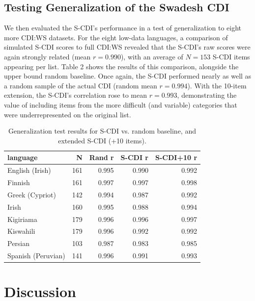 \documentclass[10pt, letterpaper]{article}
\begin{document}
\hypertarget{testing-generalization-of-the-swadesh-cdi}{%
\subsection{Testing Generalization of the Swadesh
CDI}\label{testing-generalization-of-the-swadesh-cdi}}

We then evaluated the S-CDI's performance in a test of generalization to
eight more CDI:WS datasets. For the eight low-data languages, a
comparison of simulated S-CDI scores to full CDI:WS revealed that the
S-CDI's raw scores were again strongly related (mean \(r=0.990\)), with
an average of \(N=153\) S-CDI items appearing per list. Table 2 shows
the results of this comparison, alongside the upper bound random
baseline. Once again, the S-CDI performed nearly as well as a random
sample of the actual CDI (random mean \(r=0.994\)). With the 10-item
extension, the S-CDI's correlation rose to mean \(r=0.993\),
demonstrating the value of including items from the more difficult (and
variable) categories that were underrepresented on the original list.

\begin{table}[H]
\centering
\begingroup\fontsize{9pt}{10pt}\selectfont
\begin{tabular}{lrrrr}
  \hline
language & N & Rand r & S-CDI r & S-CDI+10 r \\ 
  \hline
English (Irish) &  161 & 0.995 & 0.990 & 0.992 \\ 
  Finnish &  161 & 0.997 & 0.997 & 0.998 \\ 
  Greek (Cypriot) &  142 & 0.994 & 0.987 & 0.992 \\ 
  Irish &  160 & 0.995 & 0.988 & 0.994 \\ 
  Kigiriama &  179 & 0.996 & 0.996 & 0.997 \\ 
  Kiswahili &  179 & 0.996 & 0.992 & 0.992 \\ 
  Persian &  103 & 0.987 & 0.983 & 0.985 \\ 
  Spanish (Peruvian) &  141 & 0.996 & 0.991 & 0.993 \\ 
   \hline
\end{tabular}
\endgroup
\caption{Generalization test results for S-CDI vs. random baseline, and extended S-CDI (+10 items).} 
\end{table}

\hypertarget{discussion}{%
\section{Discussion}\label{discussion}}
\end{document}
